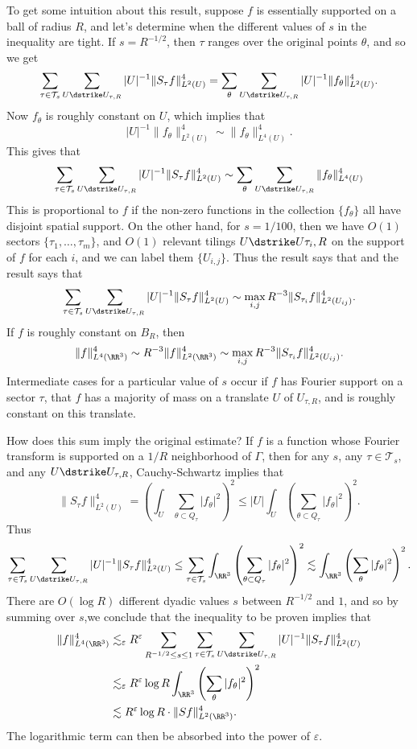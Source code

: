 To get some intuition about this result, suppose $f$ is essentially supported on a ball of radius $R$, and let's determine when the different values of $s$ in the inequality are tight. If $s = R^{-1/2}$, then $\tau$ ranges over the original points $\theta$, and so we get
%
\[ \sum_{\tau \in \mathcal{T}_s} \sum_{U \dstrike U_{\tau,R}} |U|^{-1} \| S_\tau f \|_{L^2(U)}^4 = \sum_\theta \sum_{U \dstrike U_{\tau,R}} |U|^{-1} \| f_\theta \|_{L^2(U)}^4. \]
%
Now $f_\theta$ is roughly constant on $U$, which implies that
%
\[ |U|^{-1} \| f_\theta \|_{L^2(U)}^4 \sim \| f_\theta \|_{L^4(U)}^4. \]
%
This gives that 
%
\[ \sum_{\tau \in \mathcal{T}_s} \sum_{U \dstrike U_{\tau,R}} |U|^{-1} \| S_\tau f \|_{L^2(U)}^4 \sim \sum_\theta \sum_{U \dstrike U_{\tau,R}} \| f_\theta \|_{L^4(U)}^4 \]
%
This is proportional to $f$ if the non-zero functions in the collection $\{ f_\theta \}$ all have disjoint spatial support. On the other hand, for $s = 1/100$, then we have $O(1)$ sectors $\{ \tau_1, \dots, \tau_m \}$, and $O(1)$ relevant tilings $U \dstrike U{\tau_i,R}$ on the support of $f$ for each $i$, and we can label them $\{ U_{i,j} \}$. Thus the result says that and the result says that
%
\[ \sum_{\tau \in \mathcal{T}_s} \sum_{U \dstrike U_{\tau,R}} |U|^{-1} \| S_\tau f \|_{L^2(U)}^4 \sim \max_{i,j} R^{-3} \| S_{\tau_i} f \|_{L^2(U_{ij})}^4. \]
%
If $f$ is roughly constant on $B_R$, then
%
\[ \| f \|_{L^4(\RR^3)}^4 \sim R^{-3} \| f \|_{L^2(\RR^3)}^4 \sim \max_{i,j} R^{-3} \| S_{\tau_i} f \|_{L^2(U_{ij})}^4. \]
%
Intermediate cases for a particular value of $s$ occur if $f$ has Fourier support on a sector $\tau$, that $f$ has a majority of mass on a translate $U$ of $U_{\tau,R}$, and is roughly constant on this translate.

How does this sum imply the original estimate? If $f$ is a function whose Fourier transform is supported on a $1/R$ neighborhood of $\Gamma$, then for any $s$, any $\tau \in \mathcal{T}_s$, and any $U \dstrike U_{\tau,R}$, Cauchy-Schwartz implies that
%
\[ \| S_\tau f \|_{L^2(U)}^4 = \left( \int_U \sum_{\theta \subset Q_\tau} |f_\theta|^2 \right)^2 \leq |U| \int_U \left( \sum_{\theta \subset Q_\tau} |f_\theta|^2 \right)^2. \]
%
Thus
%
\[ \sum_{\tau \in \mathcal{T}_s} \sum_{U \dstrike U_{\tau,R}} |U|^{-1} \| S_\tau f \|_{L^2(U)}^4 \leq \sum_{\tau \in \mathcal{T}_s} \int_{\RR^3} \left( \sum_{\theta \subset Q_\tau} |f_\theta|^2 \right)^2 \lesssim \int_{\RR^3} \left( \sum_\theta |f_\theta|^2 \right)^2. \]
%
There are $O(\log R)$ different dyadic values $s$ between $R^{-1/2}$ and $1$, and so by summing over $s$,we conclude that the inequality to be proven implies that
%
\begin{align*}
    \| f \|_{L^4(\RR^3)}^4 &\lesssim_\varepsilon R^\varepsilon \sum_{R^{-1/2} \leq s \leq 1} \sum_{\tau \in \mathcal{T}_s} \sum_{U \dstrike U_{\tau,R}} |U|^{-1} \| S_\tau f \|_{L^2(U)}^4\\
    &\lesssim_\varepsilon R^\varepsilon \log R \int_{\RR^3} \left( \sum_\theta |f_\theta|^2 \right)^2\\
    &\lesssim R^\varepsilon \log R \cdot \| Sf \|_{L^2(\RR^3)}^4.
\end{align*}
%
The logarithmic term can then be absorbed into the power of $\varepsilon$.

